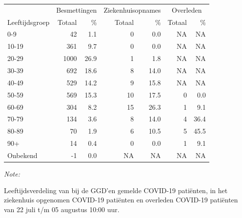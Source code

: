 \documentclass[
  english,
  man,floatsintext]{apa6}
\begin{document}
\begin{table}[H]
\centering\begingroup\fontsize{11}{13}\selectfont

\begin{threeparttable}
\begin{tabular}{lrrrrrr}
\toprule
\multicolumn{1}{c}{ } & \multicolumn{2}{c}{Besmettingen} & \multicolumn{2}{c}{Ziekenhuisopnames} & \multicolumn{2}{c}{Overleden} \\
\cmidrule(l{3pt}r{3pt}){2-3} \cmidrule(l{3pt}r{3pt}){4-5} \cmidrule(l{3pt}r{3pt}){6-7}
Leeftijdsgroep & Totaal & \% & Totaal & \% & Totaal & \%\\
\midrule
0-9 & 42 & 1.1 & 0 & 0.0 & NA & NA\\
10-19 & 361 & 9.7 & 0 & 0.0 & NA & NA\\
20-29 & 1000 & 26.9 & 1 & 1.8 & NA & NA\\
30-39 & 692 & 18.6 & 8 & 14.0 & NA & NA\\
40-49 & 529 & 14.2 & 9 & 15.8 & NA & NA\\
50-59 & 569 & 15.3 & 10 & 17.5 & 0 & 0.0\\
60-69 & 304 & 8.2 & 15 & 26.3 & 1 & 9.1\\
70-79 & 134 & 3.6 & 8 & 14.0 & 4 & 36.4\\
80-89 & 70 & 1.9 & 6 & 10.5 & 5 & 45.5\\
90+ & 14 & 0.4 & 0 & 0.0 & 1 & 9.1\\
Onbekend & -1 & 0.0 & NA & NA & NA & NA\\
\bottomrule
\end{tabular}
\begin{tablenotes}
\item \textit{Note: } 
\item Leeftijdsverdeling van bij de GGD’en gemelde COVID-19 patiënten, in het ziekenhuis opgenomen COVID-19 patiënten en overleden COVID-19 patiënten van 22 juli t/m 05 augustus 10:00 uur.
\end{tablenotes}
\end{threeparttable}
\endgroup{}
\end{table}
\end{document}
